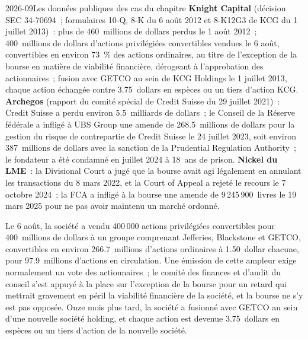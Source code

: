 \begin{dated}{2026-09}{Les données publiques des cas du chapitre}\label{dat:fm:case-studies-ii:record}
\textbf{Knight Capital} (décision SEC 34-70694~; formulaires 10-Q, 8-K du 6 août 2012 et 8-K12G3 de KCG du 1 juillet 2013)~: plus de 460~millions de dollars perdus
le 1 août 2012~; 400~millions de dollars d'actions privilégiées convertibles vendues le 6 août, convertibles en environ 73~\% des actions ordinaires, au titre de l'exception de la bourse
en matière de viabilité financière, dérogeant à l'approbation des actionnaires~; fusion avec GETCO au sein de KCG Holdings le 1 juillet 2013, chaque action échangée contre 3.75~dollars en espèces
ou un tiers d'action KCG. \textbf{Archegos} (rapport du comité spécial de Credit Suisse du 29 juillet 2021)~: Credit Suisse a perdu environ 5.5~milliards de dollars~; le Conseil
de la Réserve fédérale a infligé à UBS Group une amende de 268.5~millions de dollars pour la gestion du risque de contrepartie de Credit Suisse le 24 juillet 2023, soit environ 387~millions de dollars avec la sanction de la
Prudential Regulation Authority~; le fondateur a été condamné en juillet 2024 à 18~ans de prison. \textbf{Nickel du LME}~: la Divisional Court
a jugé que la bourse avait agi légalement en annulant les transactions du 8 mars 2022, et la Court of Appeal a rejeté le recours le 7 octobre 2024~; la FCA
a infligé à la bourse une amende de 9\,245\,900~livres le 19 mars 2025 pour ne pas avoir maintenu un marché ordonné.
\end{dated}

Le 6 août, la société a vendu 400\,000 actions privilégiées convertibles pour 400~millions de dollars à un groupe comprenant Jefferies, Blackstone et GETCO,
convertibles en environ 266.7~millions d'actions ordinaires à 1.50~dollar chacune, pour 97.9~millions d'actions en circulation. Une émission de cette ampleur exige normalement un
vote des actionnaires~; le comité des finances et d'audit du conseil s'est appuyé à la place sur l'exception de la bourse pour un retard qui mettrait gravement en péril la
viabilité financière de la société, et la bourse ne s'y est pas opposée. Onze mois plus tard, la société a fusionné avec GETCO au sein d'une nouvelle société holding, et
chaque action est devenue 3.75~dollars en espèces ou un tiers d'action de la nouvelle société.

